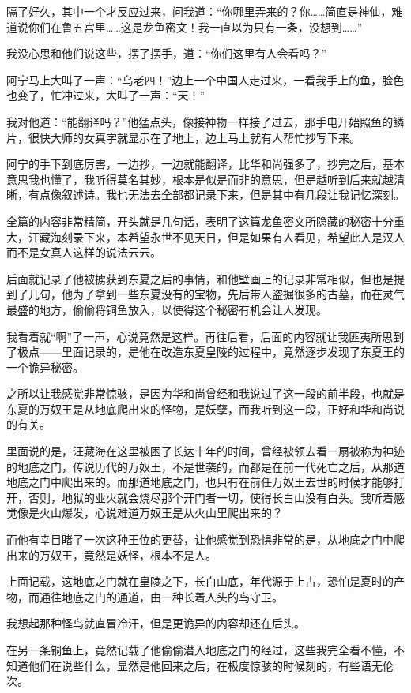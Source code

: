 隔了好久，其中一个才反应过来，问我道：“你哪里弄来的？你……简直是神仙，难道说你们在鲁五宫里……这是龙鱼密文！我一直以为只有一条，没想到……”

我没心思和他们说这些，摆了摆手，道：“你们这里有人会看吗？”

阿宁马上大叫了一声：“乌老四！”边上一个中国人走过来，一看我手上的鱼，脸色也变了，忙冲过来，大叫了一声：“天！”

我对他道：“能翻译吗？”他猛点头，像接神物一样接了过去，那手电开始照鱼的鳞片，很快大师的女真字就显示在了地上，边上马上就有人帮忙抄写下来。

阿宁的手下到底厉害，一边抄，一边就能翻译，比华和尚强多了，抄完之后，基本意思我也懂了，我听得莫名其妙，根本是似是而非的意思，但是越听到后来就越清晰，有点像叙述诗。我也无法去全部都记录下来，但是其中有几段让我记忆深刻。

全篇的内容非常精简，开头就是几句话，表明了这篇龙鱼密文所隐藏的秘密十分重大，汪藏海刻录下来，本希望永世不见天日，但是如果有人看见，希望此人是汉人而不是女真人这样的说法云云。

后面就记录了他被掳获到东夏之后的事情，和他壁画上的记录非常相似，但也是提到了几句，他为了拿到一些东夏没有的宝物，先后带人盗掘很多的古墓，而在灵气最盛的地方，偷偷将铜鱼放入，以使得这个秘密有机会让人发现。

我看着就“啊”了一声，心说竟然是这样。再往后看，后面的内容就让我匪夷所思到了极点——里面记录的，是他在改造东夏皇陵的过程中，竟然逐步发现了东夏王的一个诡异秘密。

之所以让我感觉非常惊骇，是因为华和尚曾经和我说过了这一段的前半段，也就是东夏的万奴王是从地底爬出来的怪物，是妖孽，而我听到这一段，正好和华和尚说的有关。

里面说的是，汪藏海在这里被困了长达十年的时间，曾经被领去看一扇被称为神迹的地底之门，传说历代的万奴王，不是世袭的，而都是在前一代死亡之后，从那道地底之门中爬出来的。而那道地底之门，也只有在前任万奴王去世的时候才能够打开，否则，地狱的业火就会烧尽那个开门者一切，使得长白山没有白头。我听着感觉像是火山爆发，心说难道万奴王是从火山里爬出来的？

而他有幸目睹了一次这种王位的更替，让他感觉到恐惧非常的是，从地底之门中爬出来的万奴王，竟然是妖怪，根本不是人。

上面记载，这地底之门就在皇陵之下，长白山底，年代源于上古，恐怕是夏时的产物，而通往地底之门的通道，由一种长着人头的鸟守卫。

我想起那种怪鸟就直冒冷汗，但是更诡异的内容却还在后头。

在另一条铜鱼上，竟然记载了他偷偷潜入地底之门的经过，这些我完全看不懂，不知道他们在说些什么，显然是他回来之后，在极度惊骇的时候刻的，有些语无伦次。

